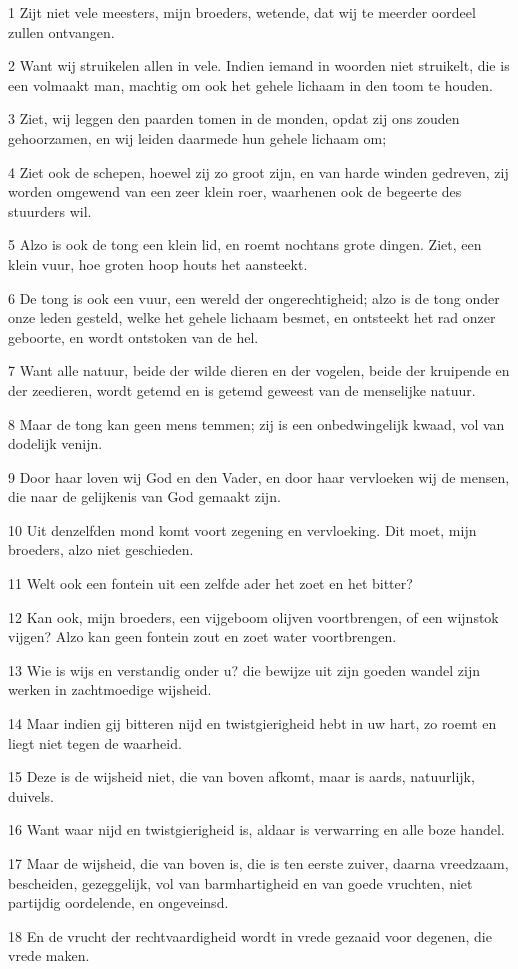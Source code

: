 \par 1 Zijt niet vele meesters, mijn broeders, wetende, dat wij te meerder oordeel zullen ontvangen.
\par 2 Want wij struikelen allen in vele. Indien iemand in woorden niet struikelt, die is een volmaakt man, machtig om ook het gehele lichaam in den toom te houden.
\par 3 Ziet, wij leggen den paarden tomen in de monden, opdat zij ons zouden gehoorzamen, en wij leiden daarmede hun gehele lichaam om;
\par 4 Ziet ook de schepen, hoewel zij zo groot zijn, en van harde winden gedreven, zij worden omgewend van een zeer klein roer, waarhenen ook de begeerte des stuurders wil.
\par 5 Alzo is ook de tong een klein lid, en roemt nochtans grote dingen. Ziet, een klein vuur, hoe groten hoop houts het aansteekt.
\par 6 De tong is ook een vuur, een wereld der ongerechtigheid; alzo is de tong onder onze leden gesteld, welke het gehele lichaam besmet, en ontsteekt het rad onzer geboorte, en wordt ontstoken van de hel.
\par 7 Want alle natuur, beide der wilde dieren en der vogelen, beide der kruipende en der zeedieren, wordt getemd en is getemd geweest van de menselijke natuur.
\par 8 Maar de tong kan geen mens temmen; zij is een onbedwingelijk kwaad, vol van dodelijk venijn.
\par 9 Door haar loven wij God en den Vader, en door haar vervloeken wij de mensen, die naar de gelijkenis van God gemaakt zijn.
\par 10 Uit denzelfden mond komt voort zegening en vervloeking. Dit moet, mijn broeders, alzo niet geschieden.
\par 11 Welt ook een fontein uit een zelfde ader het zoet en het bitter?
\par 12 Kan ook, mijn broeders, een vijgeboom olijven voortbrengen, of een wijnstok vijgen? Alzo kan geen fontein zout en zoet water voortbrengen.
\par 13 Wie is wijs en verstandig onder u? die bewijze uit zijn goeden wandel zijn werken in zachtmoedige wijsheid.
\par 14 Maar indien gij bitteren nijd en twistgierigheid hebt in uw hart, zo roemt en liegt niet tegen de waarheid.
\par 15 Deze is de wijsheid niet, die van boven afkomt, maar is aards, natuurlijk, duivels.
\par 16 Want waar nijd en twistgierigheid is, aldaar is verwarring en alle boze handel.
\par 17 Maar de wijsheid, die van boven is, die is ten eerste zuiver, daarna vreedzaam, bescheiden, gezeggelijk, vol van barmhartigheid en van goede vruchten, niet partijdig oordelende, en ongeveinsd.
\par 18 En de vrucht der rechtvaardigheid wordt in vrede gezaaid voor degenen, die vrede maken.

